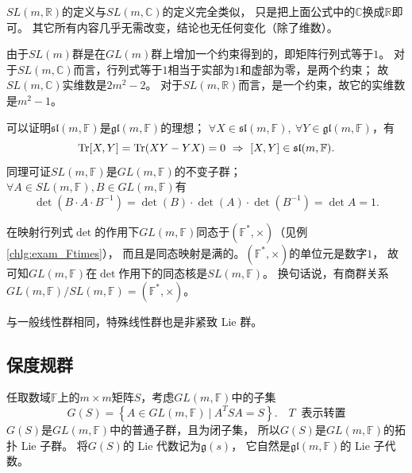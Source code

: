 

$SL(m,\mathbb{R})$的定义与$SL(m,\mathbb{C})$的定义完全类似，
只是把上面公式中的$\mathbb{C}$换成$\mathbb{R}$即可。
其它所有内容几乎无需改变，结论也无任何变化（除了维数）。

由于$SL(m)$群是在$GL(m)$群上增加一个约束得到的，即矩阵行列式等于$1$。
对于$SL(m,\mathbb{C})$而言，行列式等于$1$相当于实部为$1$和虚部为零，是两个约束；
故$SL(m,\mathbb{C})$实维数是$2m^2 -2$。
对于$SL(m,\mathbb{R})$而言，是一个约束，故它的实维数是$m^2-1$。

可以证明$\mathfrak{sl}(m,\mathbb{F})$是$\mathfrak{gl}(m,\mathbb{F})$的{\kaishu 理想}；
$\forall X \in \mathfrak{sl}(m,\mathbb{F}), \  \forall Y \in \mathfrak{gl}(m,\mathbb{F})$，有
\begin{equation}
    {\rm Tr}[X,Y]={\rm Tr}(XY-YX) = 0 \ \Rightarrow \ 
    [X,Y] \in \mathfrak{sl}(m,\mathbb{F}).
\end{equation}
同理可证$SL(m,\mathbb{F})$是$GL(m,\mathbb{F})$的{\kaishu 不变子群}；
$\forall A \in SL(m,\mathbb{F}),  B \in GL(m,\mathbb{F})$有
\begin{equation}
    \det\left(B\cdot A \cdot B^{-1}\right)
    =\det\left(B\right)\cdot\det\left(A\right)\cdot\det\left(B^{-1}\right)
    =\det A =1.
\end{equation}

在映射行列式$\det$的作用下$GL(m,\mathbb{F})$同态于$(\mathbb{F}^*,\times)$（见例\ref{chlg:exam_Ftimes}），
而且是同态映射是满的。$(\mathbb{F}^*,\times)$的单位元是数字$1$，
故可知$GL(m,\mathbb{F})$在$\det$作用下的同态核是$SL(m,\mathbb{F})$。
换句话说，有商群关系$GL(m,\mathbb{F})/SL(m,\mathbb{F})=(\mathbb{F}^*,\times)$。

与一般线性群相同，特殊线性群也是非紧致 Lie 群。





\subsection{保度规群}\label{chlg:sec_isometry}


任取数域$\mathbb{F}$上的$m\times m$矩阵$S$，考虑$GL(m,\mathbb{F})$中的子集
\begin{equation}\label{chlg:eqn_gsinit}
    G(S)= \left\{ A \in GL(m,\mathbb{F})\ |\  A^T S {A} =S \right\}.
    \quad  T\ \text{ 表示转置}
\end{equation}
$G(S)$是$GL(m,\mathbb{F})$中的普通子群，且为闭子集，
所以$G(S)$是$GL(m,\mathbb{F})$的拓扑 Lie 子群。
将$G(S)$的 Lie 代数记为$\mathfrak{g}(s)$，
它自然是$\mathfrak{gl}(m,\mathbb{F})$的 Lie 子代数。

